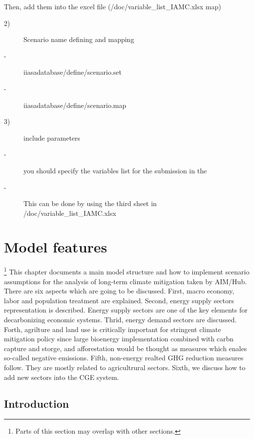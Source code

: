 \documentclass[10pt,a4paper,titlepage,dvipdfmx]{book}
\begin{document}
Then, add them into the excel file (/doc/variable\_list\_IAMC.xlsx map)
\begin{description}
\item[2)]Scenario name defining and mapping
\item[-]iiasadatabase/define/scenario.set
\item[-]iiasadatabase/define/scenario.map
\end{description}

\begin{description}
\item[3)]include parameters
\item[-]you should specify the variables list for the submission in the 
\item[-]This can be done by using the third sheet in /doc/variable\_list\_IAMC.xlsx
\end{description}
\chapter{\label{chp:ModFea}{Model features}}
\footnote{Parts of this section may overlap with other sections.}\label{mark-11.}
{This chapter documents a main model structure and how to implement scenario assumptions for the analysis of long-term climate mitigation taken by AIM/Hub. There are six aspects which are going to be discussed. First, macro economy, labor and population treatment are explained. Second, energy supply sectors representation is described. Energy supply sectors are one of the key elements for decarbonizing economic systems. Thrid, energy demand sectors are discussed. Forth, agrilture and land use is critically important for stringent climate mitigation policy since large bioenergy implementation combined with carbn capture and storge, and afforestation would be thought as measures which enales so-called negative emissions. Fifth, non-energy realted GHG reduction measures follow. They are mostly related to agricultrural sectors. Sixth, we discuss how to add new sectors into the CGE system.}

\section{\label{sec:SomTIPS-Int}{Introduction}}
\end{document}

